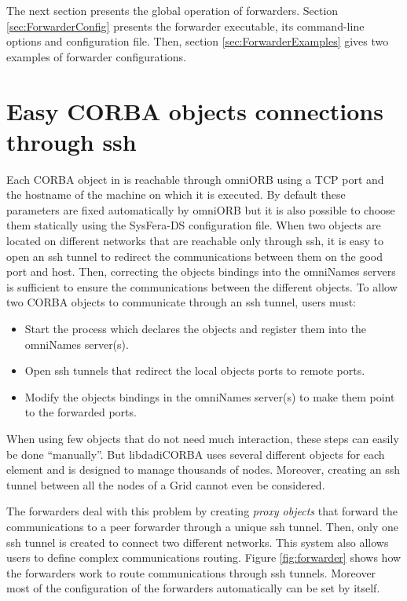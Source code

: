 \documentclass{report}
\begin{document}
The next section presents the global operation of
forwarders. Section \ref{sec:ForwarderConfig} presents the forwarder
executable, its command-line options and configuration file. Then,
section \ref{sec:ForwarderExamples} gives two examples of forwarder
configurations.

\section*{Easy CORBA objects connections through ssh}
Each CORBA object in is reachable through omniORB using a TCP
port and the hostname of the machine on which it is executed. By
default these parameters are fixed automatically by omniORB but it is
also possible to choose them statically using the SysFera-DS configuration
file.
When two objects are located on different networks that are reachable
only through ssh, it is easy to open an ssh tunnel to redirect the
communications between them on the good port and host. Then, correcting
the objects bindings into the omniNames servers is sufficient to ensure
the communications between the different objects. To allow two
CORBA objects to communicate through an ssh tunnel, users must:
\begin{itemize}
\item Start the process which declares the objects and register them
  into the omniNames server(s).
\item Open ssh tunnels that redirect the local objects ports to
  remote ports.
\item Modify the objects bindings in the omniNames server(s) to make
  them point to the forwarded ports.
\end{itemize}

When using few objects that do not need much interaction, these steps
can easily be done ``manually''. But libdadiCORBA uses several different
objects for each element and is designed to manage thousands of nodes.
Moreover, creating an ssh tunnel between all the nodes of a Grid
cannot even be considered.

The forwarders deal with this problem by creating \textit{proxy
  objects} that forward the communications to a peer forwarder through
a unique ssh tunnel. Then, only one ssh tunnel is created to connect
two different networks. This system also allows users to define complex
communications routing. Figure \ref{fig:forwarder} shows how the
forwarders work to route communications through ssh tunnels. Moreover
most of the configuration of the forwarders automatically can be set
by itself.
\end{document}

